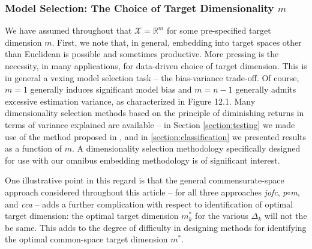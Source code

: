 \documentclass[12pt,xcolor]{article}
\newcommand{\1}{\ensuremath{\mbox{{\bf 1}}}}
\begin{document}
\begin{comment}
djm:
After the last sentence:
Other functions $f(\Delta_1,\Delta_2)$ could be investigate for imputation:
$\min$ and $\max$ are obvious suggestions. Also, one might consider trying to
impute the diagonal with something other than $0$. While there is a good rationale
for using $0$'s, there may be use-cases where imputing other values would be
appropriate. For example, if one knows something about the pairings that implies
that some pairings are better than others, and hence one might infer that
some of the ``poor'' pairings
could profitably gain from larger diagonal values in $W$.
\end{comment}

\subsubsection*{Model Selection: The Choice of Target Dimensionality $m$}

We have assumed throughout that $\mathcal{X} = \mathbb{R}^m$
for some pre-specified target dimension $m$.
First, we note that, in general, embedding into target spaces other than Euclidean is possible
and sometimes productive.
More pressing is the necessity, in many applications, for data-driven choice of target dimension.
This is in general a vexing model selection task -- the bias-variance trade-off.
Of course, $m=1$ generally induces significant model bias
and $m=n-1$ generally admits excessive estimation variance,
as characterized in \cite{DGL} Figure 12.1.
Many dimensionality selection methods based on the principle of diminishing returns in terms of variance explained
are available -- in Section \ref{section:testing} we made use of the method proposed in \cite{ZhuGhodsi},
and in \ref{section:classification} we presented results as a function of $m$.
A dimensionality selection methodology specifically designed for use with our omnibus embedding methodology is of significant interest.

One illustrative point in this regard is that the general commensurate-space approach considered throughout
this article -- for all three approaches {\em jofc}, {\it p}$\circ${\it m}, and {\em cca} --
adds a further complication with respect to identification of optimal target dimension:
the optimal target dimension $m_k^*$ for the various $\Delta_k$ will not the be same.
This adds to the degree of difficulty in designing methods for identifying
the optimal common-space target dimension $m^*$.
\end{document}
